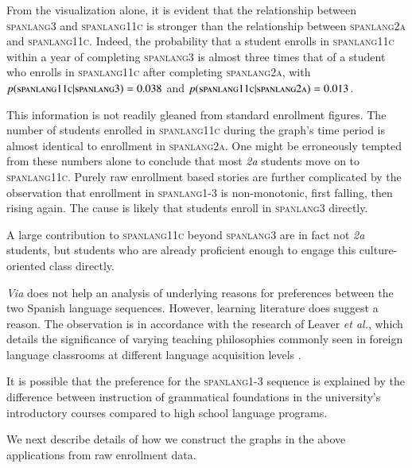 From the visualization alone, it is evident that the relationship
between \textsc{spanlang3} and \textsc{spanlang11c} is stronger than
the relationship between \textsc{spanlang2a} and
\textsc{spanlang11c}. Indeed, the probability that a student enrolls
in \textsc{spanlang11c} within a year of completing \textsc{spanlang3}
is almost three times that of a student who enrolls in
\textsc{spanlang11c} after completing \textsc{spanlang2a}, with
$p(\textsc{spanlang11c}|\textsc{spanlang3}) = 0.038$ and
$p(\textsc{spanlang11c}|\textsc{spanlang2a}) = 0.013$.

This information is not readily gleaned from standard enrollment
figures. The number of students enrolled in \textsc{spanlang11c}
during the graph's time period is almost identical to enrollment in
\textsc{spanlang2a}. One might be erroneously tempted from these
numbers alone to conclude that most {\em 2a} students move on to
\textsc{spanlang11c}. Purely raw enrollment based stories are further
complicated by the observation that enrollment in \textsc{spanlang1-3}
is non-monotonic, first falling, then rising again. The cause is
likely that students enroll in \textsc{spanlang3} directly.

A large contribution to \textsc{spanlang11c} beyond \textsc{spanlang3}
are in fact not {\em 2a} students, but students who are already
proficient enough to engage this culture-oriented class directly.

{\em Via} does not help an analysis of underlying reasons for
preferences between the two Spanish language sequences. However,
learning literature does suggest a reason. The observation is in
accordance with the research of Leaver \textit{et al.}, which details
the significance of varying teaching philosophies commonly seen in
foreign language classrooms at different language acquisition levels
\cite{Leaver2002}.

It is possible that the preference for the \textsc{spanlang1-3}
sequence is explained by the difference between instruction of
grammatical foundations in the university's introductory courses
compared to high school language programs.

We next describe details of how we construct the graphs in the above
applications from raw enrollment data.
